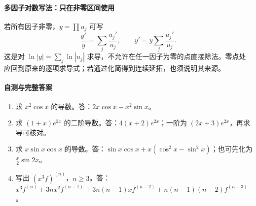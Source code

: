 \paragraph{多因子对数写法：只在非零区间使用}
若所有因子非零，$y=\prod u_j$ 可写
\[
 \frac{y'}y=\sum_j\frac{u_j'}{u_j},\qquad
 y'=y\sum_j\frac{u_j'}{u_j}.
\]
这是对 $\ln|y|=\sum_j\ln|u_j|$ 求导，不允许在任一因子为零的点直接除法。零点处应回到原来的逐项求导式；若通过化简得到连续延拓，也须说明其来源。

\paragraph{自测与完整答案}
\begin{enumerate}
\item 求 $x^2\cos x$ 的导数。答：$2x\cos x-x^2\sin x$。
\item 求 $(1+x)e^{2x}$ 的二阶导数。答：$4(x+2)e^{2x}$；一阶为 $(2x+3)e^{2x}$，再求导可核对。
\item 求 $x\sin x\cos x$ 的导数。答：$\sin x\cos x+x(\cos^2x-\sin^2x)$；也可先化为 $\tfrac{x}{2}\sin2x$。
\item 写出 $(x^3f)^{(n)}$，$n\ge3$。答：$x^3f^{(n)}+3nx^2f^{(n-1)}+3n(n-1)xf^{(n-2)}+n(n-1)(n-2)f^{(n-3)}$。
\end{enumerate}
